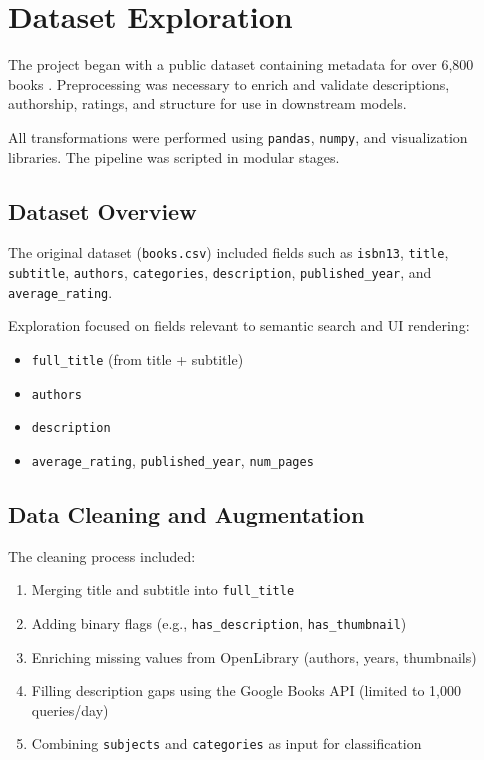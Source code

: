 \chapter{Dataset Exploration}
\label{chapter:dataset}

The project began with a public dataset containing metadata for over 6,800 books \cite{7k-books}. Preprocessing was necessary to enrich and validate descriptions, authorship, ratings, and structure for use in downstream models.

All transformations were performed using \texttt{pandas}, \texttt{numpy}, and visualization libraries. The pipeline was scripted in modular stages.

\section{Dataset Overview}
\label{sec:dataset-overview}

The original dataset (\texttt{books.csv}) included fields such as \texttt{isbn13}, \texttt{title}, \texttt{subtitle}, \texttt{authors}, \texttt{categories}, \texttt{description}, \texttt{published\_year}, and \texttt{average\_rating}.

Exploration focused on fields relevant to semantic search and UI rendering:

\begin{itemize}
    \item \texttt{full\_title} (from title + subtitle)
    \item \texttt{authors}
    \item \texttt{description}
    \item \texttt{average\_rating}, \texttt{published\_year}, \texttt{num\_pages}
\end{itemize}

\section{Data Cleaning and Augmentation}
\label{sec:data-cleaning}

The cleaning process included:

\begin{enumerate}
    \item Merging title and subtitle into \texttt{full\_title}
    \item Adding binary flags (e.g., \texttt{has\_description}, \texttt{has\_thumbnail})
    \item Enriching missing values from OpenLibrary (authors, years, thumbnails)
    \item Filling description gaps using the Google Books API (limited to 1,000 queries/day)
    \item Combining \texttt{subjects} and \texttt{categories} as input for classification
\end{enumerate}

